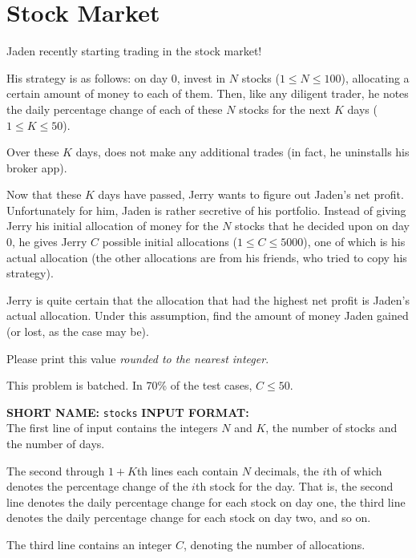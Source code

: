 \documentclass[twoside]{article}
\newcommand{\blank}{\vskip 3mm}
\begin{document}



\section{Stock Market}

Jaden recently starting trading in the stock market!

His strategy is as follows: on day $0$, invest in $N$ stocks ($1 \leq N \leq 100$), allocating a certain amount of money to each of them. Then, like any diligent trader, he notes the daily percentage change of each of these $N$ stocks for the next $K$ days ($1 \leq K \leq 50$). 

Over these $K$ days, does not make any additional trades (in fact, he uninstalls his broker app).

Now that these $K$ days have passed, Jerry wants to figure out Jaden's net profit. Unfortunately for him, Jaden is rather secretive of his portfolio. Instead of giving Jerry his initial allocation of money for the $N$ stocks that he decided upon on day $0$, he gives Jerry $C$ possible initial allocations ($1 \leq C \leq 5000$), one of which is his actual allocation (the other allocations are from his friends, who tried to copy his strategy).

Jerry is quite certain that the allocation that had the highest net profit is Jaden's actual allocation. Under this assumption, find the amount of money Jaden gained (or lost, as the case may be).

Please print this value \textit{rounded to the nearest integer}.

\blank
This problem is batched. In 70\% of the test cases, $C \leq 50$.

\blank
\textbf{SHORT NAME:} \verb|stocks|
\blank
\textbf{INPUT FORMAT:}\\
The first line of input contains the integers $ N $ and $K$, the number of stocks and the number of days.

The second through $1+K$th lines each contain $N$ decimals, the $i$th of which denotes the percentage change of the $i$th stock for the day. That is, the second line denotes the daily percentage change for each stock on day one, the third line denotes the daily percentage change for each stock on day two, and so on.

The third line contains an integer $C$, denoting the number of allocations.
\end{document}
